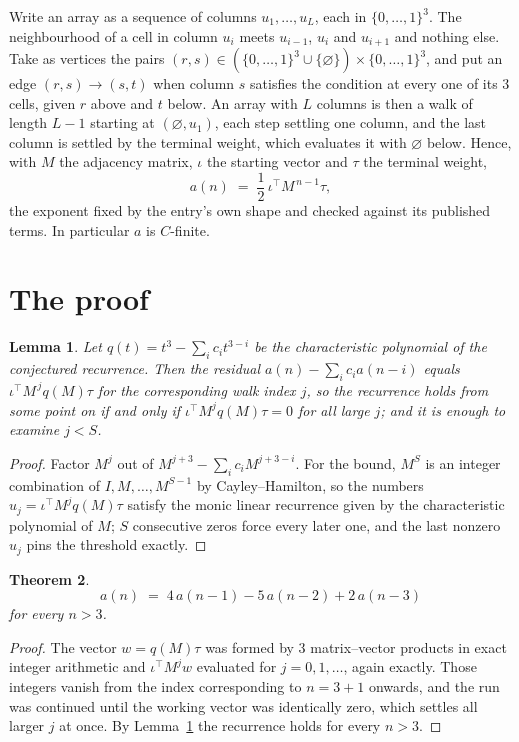 \documentclass[11pt,a4paper]{article}
\theoremstyle{plain}
\newtheorem{theorem}{Theorem}
\newtheorem{lemma}[theorem]{Lemma}
\theoremstyle{definition}
\begin{document}
Write an array as a sequence of columns $u_1,\dots,u_L$, each in
$\{0,\dots,1\}^{3}$. The neighbourhood of a cell in column $u_i$ meets $u_{i-1}$,
$u_i$ and $u_{i+1}$ and nothing else. Take as vertices the pairs
$(r,s)\in(\{0,\dots,1\}^{3}\cup\{\varnothing\})\times\{0,\dots,1\}^{3}$,
and put an edge $(r,s)\to(s,t)$ when column $s$ satisfies the condition at every one of its
$3$ cells, given $r$ above and $t$ below. An array with $L$ columns is then a walk of length
$L-1$ starting at $(\varnothing,u_1)$, each step settling one column, and the last column is
settled by the terminal weight, which evaluates it with $\varnothing$ below. Hence,
with $M$ the adjacency matrix, $\iota$ the starting vector and $\tau$ the terminal weight,
\[
a(n)\;=\;\frac{1}{2}\,\iota^{\!\top}M^{\,n-1}\tau ,
\]
the exponent fixed by the entry's own shape and checked against its published terms. In
particular $a$ is $C$-finite.

\section{The proof}

\begin{lemma}\label{lem:crit}
Let $q(t)=t^{3}-\sum_i c_it^{3-i}$ be the characteristic polynomial of the
conjectured recurrence. Then the residual $a(n)-\sum_ic_ia(n-i)$ equals
$\iota^{\!\top}M^{\,j}q(M)\tau$ for the corresponding walk index $j$, so the
recurrence holds from some point on if and only if $\iota^{\!\top}M^{j}q(M)\tau=0$ for all
large $j$; and it is enough to examine $j<S$.
\end{lemma}

\begin{proof}
Factor $M^{j}$ out of $M^{j+3}-\sum_ic_iM^{j+3-i}$. For the bound, $M^{S}$
is an integer combination of $I,M,\dots,M^{S-1}$ by Cayley--Hamilton, so the numbers
$u_j=\iota^{\!\top}M^{j}q(M)\tau$ satisfy the monic linear recurrence given by the
characteristic polynomial of $M$; $S$ consecutive zeros force every later one, and the last
nonzero $u_j$ pins the threshold exactly.
\end{proof}

\begin{theorem}
\[
a(n)\;=\;4\,a(n-1) - 5\,a(n-2) + 2\,a(n-3)
\]
for every $n>3$.
\end{theorem}

\begin{proof}
The vector $w=q(M)\tau$ was formed by $3$ matrix--vector products in exact integer
arithmetic and $\iota^{\!\top}M^{j}w$ evaluated for $j=0,1,\dots$, again exactly. Those
integers vanish from the index corresponding to $n=3+1$ onwards, and the run was
continued until the working vector was identically zero, which settles all larger $j$ at once.
By Lemma~\ref{lem:crit} the recurrence holds for every $n>3$.
\end{proof}
\end{document}
